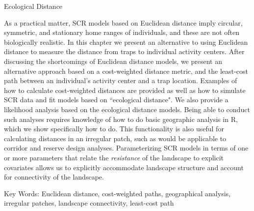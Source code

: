 Ecological Distance

As a practical matter, SCR models based on Euclidean distance imply
circular, symmetric, and stationary home ranges of individuals, and
these are not often biologically realistic.  In this chapter we
present an alternative to using Euclidean distance to measure the
distance from traps to individual activity centers.  After discussing
the shortcomings of Euclidean distance models, we present an
alternative approach based on a cost-weighted distance metric, and the
least-cost path between an individual's activity center and a trap
location.  Examples of how to calculate cost-weighted distances are
provided as well as how to simulate SCR data and fit models based on
``ecological distance".  We also provide a likelihood analysis based
on the ecological distance models.  Being able to conduct such
analyses requires knowledge of how to do basic geographic analysis in
R, which we show specifically how to do.  This functionality is also
useful for calculating distances in an irregular patch, such as would
be applicable to corridor and reserve design analyses.  Parameterizing
SCR models in terms of one or more parameters that relate the {\it
resistance} of the landscape to explicit covariates allows us to
explicitly accommodate landscape structure and account for
connectivity of the landscape.

Key Words:  Euclidean distance, 
 cost-weighted paths,
geographical analysis,
irregular patches,
 landscape connectivity, 
least-cost path

